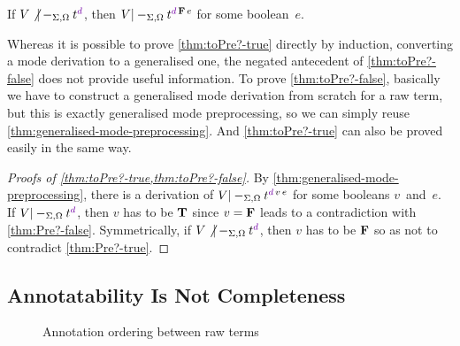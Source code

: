 \begin{corollary}\label{thm:toPre?-false}
If\/ $V \not|-_{\Sigma,\Omega} t^\dir{d}$, then $V |-_{\Sigma,\Omega} t^{\dir{d}\,\False\,e}$ for some boolean~$e$.
\end{corollary}

Whereas it is possible to prove \cref{thm:toPre?-true} directly by induction, converting a mode derivation to a generalised one, the negated antecedent of \cref{thm:toPre?-false} does not provide useful information.
To prove \cref{thm:toPre?-false}, basically we have to construct a generalised mode derivation from scratch for a raw term, but this is exactly generalised mode preprocessing, so we can simply reuse \cref{thm:generalised-mode-preprocessing}.
And \cref{thm:toPre?-true} can also be proved easily in the same way.

\begin{proof}[Proofs of \cref{thm:toPre?-true,thm:toPre?-false}]

By \cref{thm:generalised-mode-preprocessing}, there is a derivation of $V |-_{\Sigma,\Omega} t^{\dir{d}\,v\,e}$ for some booleans $v$~and~$e$.
If $V |-_{\Sigma,\Omega} t^\dir{d}$, then $v$ has to be $\mathbf{T}$ since $v = \mathbf{F}$ leads to a contradiction with \cref{thm:Pre?-false}.
Symmetrically, if $V \not|-_{\Sigma,\Omega} t^\dir{d}$, then $v$ has to be $\mathbf{F}$ so as not to contradict \cref{thm:Pre?-true}.
\end{proof}


\subsection{Annotatability Is Not Completeness}
\label{sec:annotatability}


\begin{figure}
  \centering\small
  
  \caption{Annotation ordering between raw terms}
  \label{fig:annotation-order}
\end{figure}

